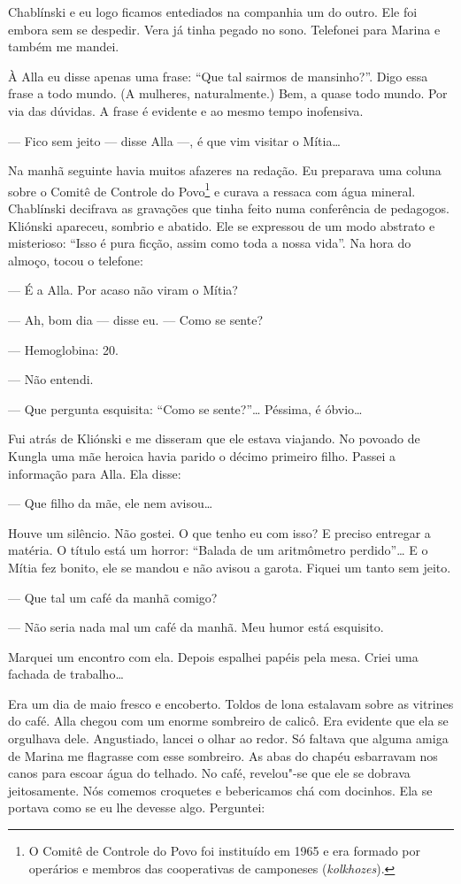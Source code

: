 Chablínski e eu logo ficamos entediados na companhia um do outro. Ele
foi embora sem se despedir. Vera já tinha pegado no sono. Telefonei para
Marina e também me mandei.

À Alla eu disse apenas uma frase: ``Que tal sairmos de mansinho?''. Digo
essa frase a todo mundo. (A mulheres, naturalmente.) Bem, a quase todo
mundo. Por via das dúvidas. A frase é evidente e ao mesmo tempo
inofensiva.

--- Fico sem jeito --- disse Alla ---, é que vim visitar o Mítia\ldots{}

Na manhã seguinte havia muitos afazeres na redação. Eu preparava uma
coluna sobre o Comitê de Controle do Povo\footnote{O Comitê de Controle
  do Povo foi instituído em 1965 e era formado por operários e membros
  das cooperativas de camponeses (\emph{kolkhozes}).} e curava a ressaca
com água mineral. Chablínski decifrava as gravações que tinha feito numa
conferência de pedagogos. Kliónski apareceu, sombrio e abatido. Ele se
expressou de um modo abstrato e misterioso: ``Isso é pura ficção, assim
como toda a nossa vida''. Na hora do almoço, tocou o telefone:

--- É a Alla. Por acaso não viram o Mítia?

--- Ah, bom dia --- disse eu. --- Como se sente?

--- Hemoglobina: 20.

--- Não entendi.

--- Que pergunta esquisita: ``Como se sente?''\ldots{} Péssima, é óbvio\ldots{}

Fui atrás de Kliónski e me disseram que ele estava viajando. No povoado
de Kungla uma mãe heroica havia parido o décimo primeiro filho. Passei a
informação para Alla. Ela disse:

--- Que filho da mãe, ele nem avisou\ldots{}

Houve um silêncio. Não gostei. O que tenho eu com isso? E preciso
entregar a matéria. O título está um horror: ``Balada de um aritmômetro
perdido''\ldots{} E o Mítia fez bonito, ele se mandou e não avisou a garota.
Fiquei um tanto sem jeito.

--- Que tal um café da manhã comigo?

--- Não seria nada mal um café da manhã. Meu humor está esquisito.

Marquei um encontro com ela. Depois espalhei papéis pela mesa. Criei uma
fachada de trabalho\ldots{}

Era um dia de maio fresco e encoberto. Toldos de lona estalavam sobre as
vitrines do café. Alla chegou com um enorme sombreiro de calicô. Era
evidente que ela se orgulhava dele. Angustiado, lancei o olhar ao redor.
Só faltava que alguma amiga de Marina me flagrasse com esse sombreiro.
As abas do chapéu esbarravam nos canos para escoar água do telhado. No
café, revelou"-se que ele se dobrava jeitosamente. Nós comemos croquetes
e bebericamos chá com docinhos. Ela se portava como se eu lhe devesse
algo. Perguntei:

